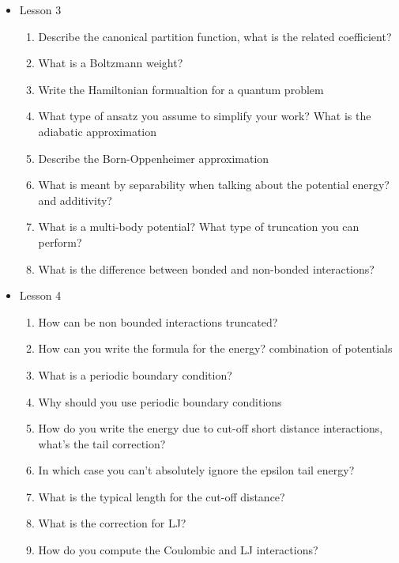 {\begin{itemize}
\begin{enumerate}
        \item How can you write the average of that quantity?
        \item What is a partition function? what type of coefficient it has?
        \item Formula for entropy in the microcanonical ensamble
    \end{enumerate}
    \item Lesson 3
    \begin{enumerate}
        \item Describe the canonical partition function, what is the related coefficient?
        \item What is a Boltzmann weight?
        \item Write the Hamiltonian formualtion for a quantum problem
        \item What type of ansatz you assume to simplify your work? What is the adiabatic approximation
        \item Describe the Born-Oppenheimer approximation
        \item What is meant by separability when talking about the potential energy? and additivity?
        \item What is a multi-body potential? What type of truncation you can perform?
        \item What is the difference between bonded and non-bonded interactions?
    \end{enumerate}    
    \item Lesson 4
    \begin{enumerate}
        \item How can be non bounded interactions truncated?
        \item How can you write the formula for the energy? combination of potentials
        \item What is a periodic boundary condition?
        \item Why should you use periodic boundary conditions 
        \item How do you write the energy due to cut-off short distance interactions, what's the tail correction?
        \item In which case you can't absolutely ignore the epsilon tail energy?
        \item What is the typical length for the cut-off distance?
        \item What is the correction for LJ?
        \item How do you compute the Coulombic and LJ interactions?

\end{enumerate}
\end{itemize}}

